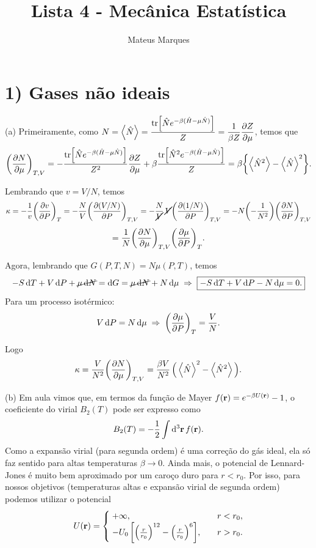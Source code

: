 \documentclass[a4paper,10pt]{article}
\title{\Huge{\textbf{Lista 4 - Mecânica Estatística}}}
\author{Mateus Marques}
\begin{document}
\maketitle

\section*{1) Gases não ideais}

(a) Primeiramente, como $\displaystyle{N = \ev{\hat{N}} = \frac{\tr[\hat{N} e^{-\beta(\hat{H} - \mu \hat{N})}]}{Z} = \frac{1}{\beta Z} \pdv{Z}{\mu}}$, temos que
$$
\pdvc{N}{\mu}{T,V} = - \frac{\tr[\hat{N} e^{-\beta(\hat{H} - \mu \hat{N})}]}{Z^2} \pdv{Z}{\mu} +
\beta \frac{\tr[\hat{N}^2 e^{-\beta(\hat{H} - \mu \hat{N})}]}{Z} =
\beta \qty{ \ev{\hat{N}^2} - \ev{\hat{N}}^2 }.
$$


Lembrando que $v = V/N$, temos
$$
\kappa = - \frac{1}{v} \qty(\pdv{v}{P})_{T} = - \frac{N}{V} \qty(\pdv{(V/N)}{P})_{T,V} =
- \frac{N}{\cancel{V}} \, \cancel{V} \qty(\pdv{(1/N)}{P})_{T, V} = -N \qty(-\frac{1}{N^2}) \qty(\pdv{N}{P})_{T,V}
$$
$$
= \frac{1}{N} \qty(\pdv{N}{\mu})_{T,V} \qty(\pdv{\mu}{P})_{T}.
$$

Agora, lembrando que $G(P,T,N) = N \mu(P,T)$, temos
$$
-S \dd{T} + V \dd{P} + \cancel{\mu \dd{N}} = \dd{G} = \cancel{\mu \dd{N}} + N \dd{\mu} \; \Rightarrow \;
\boxed{ -S \dd{T} + V \dd{P} - N \dd{\mu} = 0. }
$$
Para um processo isotérmico:
$$
V \dd{P} = N \dd{\mu} \; \Rightarrow \; \qty(\pdv{\mu}{P})_{T} = \frac{V}{N}.
$$

Logo
$$
\kappa = \frac{V}{N^2} \pdvc{N}{\mu}{T,V} = \frac{\beta V}{N^2} \, \Big(\ev{\hat{N}}^2 - \ev{\hat{N}^2}\Big).
$$

\n\n\n

(b) Em aula vimos que, em termos da função de Mayer $f(\vb{r}) = e^{-\beta U(\vb{r})} - 1$, o coeficiente do virial $B_2(T)$ pode ser expresso como
$$
B_2(T) = - \frac{1}{2} \int \dd[3]{\vb{r}} f(\vb{r}).
$$
Como a expansão virial (para segunda ordem) é uma correção do gás ideal, ela só faz sentido para altas temperaturas $\beta \to 0$. Ainda mais, o potencial de Lennard-Jones é muito bem aproximado por um caroço duro para $r < r_0$. Por isso, para nossos objetivos (temperaturas altas e expansão virial de segunda ordem) podemos utilizar o potencial
\begin{align*}
U(\vb{r}) =
\begin{cases}
\; +\infty, \quad & r < r_0, \\
\; -U_0 \, \qty[\qty(\frac{r}{r_0})^{12} - \qty(\frac{r}{r_0})^6], \quad & r > r_0.
\end{cases}
\end{align*}
\end{document}
